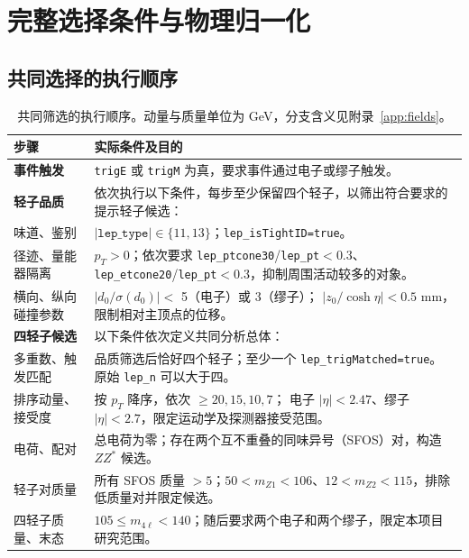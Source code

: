 \documentclass[11pt,a4paper,fontset=fandol,scheme=plain]{ctexart}
\begin{document}
\section{完整选择条件与物理归一化}\label{app:cuts}

\subsection{共同选择的执行顺序}
\begin{table}[H]
\caption{共同筛选的执行顺序。动量与质量单位为 GeV，分支含义见附录~\ref{app:fields}。}
\label{tab:cuts}
\small
\renewcommand{\arraystretch}{1.1}
\begin{tabularx}{\linewidth}{@{}p{.23\linewidth}Y@{}}
\toprule
步骤 & 实际条件及目的 \\
\midrule
\textbf{事件触发} & \texttt{trigE} 或 \texttt{trigM} 为真，要求事件通过电子或缪子触发。 \\
\midrule
\textbf{轻子品质} & 依次执行以下条件，每步至少保留四个轻子，以筛出符合要求的提示轻子候选： \\
味道、鉴别 & $|\texttt{lep\_type}|\in\{11,13\}$；\texttt{lep\_isTightID=true}。 \\
径迹、量能器隔离 & $p_T>0$；依次要求 \texttt{lep\_ptcone30}/\texttt{lep\_pt}$<0.3$、
\texttt{lep\_etcone20}/\texttt{lep\_pt}$<0.3$，抑制周围活动较多的对象。 \\
横向、纵向碰撞参数 & $|d_0/\sigma(d_0)|<$ 5（电子）或 3（缪子）；
$|z_0/\cosh\eta|<0.5$ mm，限制相对主顶点的位移。 \\
\midrule
\textbf{四轻子候选} & 以下条件依次定义共同分析总体： \\
多重数、触发匹配 & 品质筛选后恰好四个轻子；至少一个 \texttt{lep\_trigMatched=true}。
原始 \texttt{lep\_n} 可以大于四。 \\
排序动量、接受度 & 按 $p_T$ 降序，依次 $\geq20,15,10,7$；
电子 $|\eta|<2.47$、缪子 $|\eta|<2.7$，限定运动学及探测器接受范围。 \\
电荷、配对 & 总电荷为零；存在两个互不重叠的同味异号（SFOS）对，构造 $ZZ^*$ 候选。 \\
轻子对质量 & 所有 SFOS 质量 $>5$；$50<m_{Z1}<106$、$12<m_{Z2}<115$，排除低质量对并限定候选。 \\
四轻子质量、末态 & $105\leq m_{4\ell}<140$；随后要求两个电子和两个缪子，限定本项目研究范围。 \\
\bottomrule
\end{tabularx}
\end{table}
\end{document}
